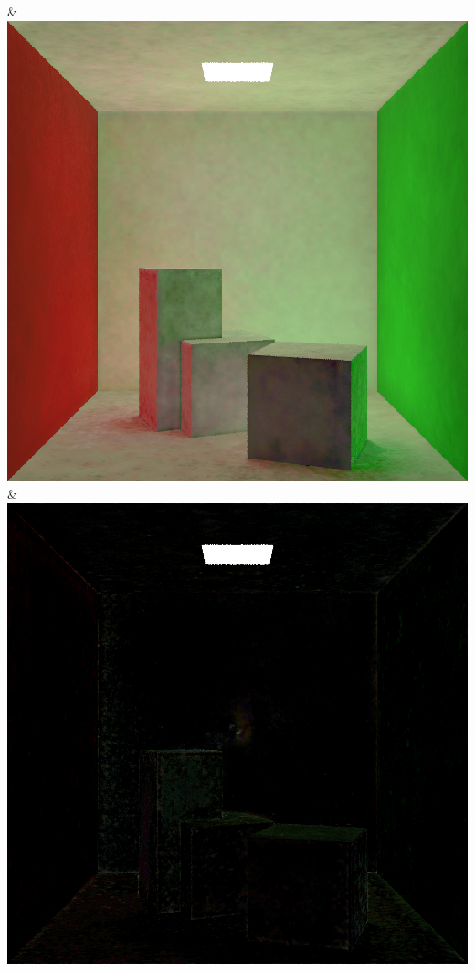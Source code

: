 & \includegraphics[width=\linewidth]{figures/py/tests/quality_comparison/nrc+lt+bal_1spp_diffuse.png}
& \includegraphics[width=\linewidth]{figures/py/tests/quality_comparison/nrc+lt+balcam_1spp_diffuse.png}
